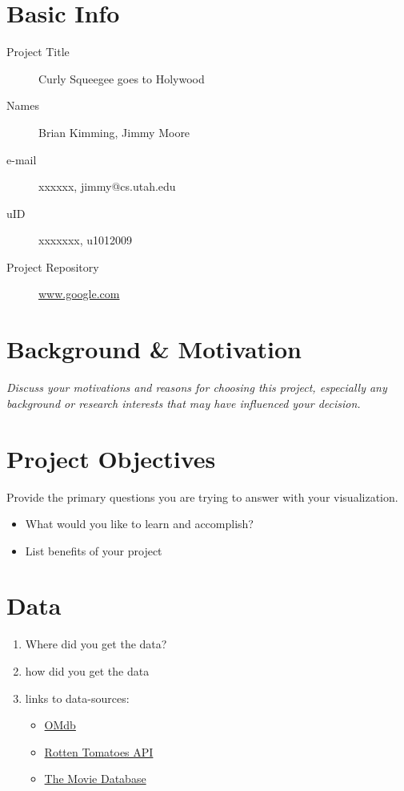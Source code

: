 \documentclass[12pt]{article}
\begin{document}
\section{Basic Info}
\begin{description}
 \item [Project Title]  Curly Squeegee goes to Holywood 
 \item [Names]  Brian Kimming, Jimmy Moore
 \item[e-mail] xxxxxx, jimmy@cs.utah.edu
 \item [uID] xxxxxxx, u1012009
 \item [Project Repository] \url{www.google.com}
\end{description}


\section{Background \& Motivation}
\textit{Discuss your motivations and reasons for choosing this project, especially any background or research interests that may have influenced your decision.}

\section{Project Objectives}
Provide the primary questions you are trying to answer with your visualization. 
\begin{itemize}
\item  What would you like to learn and accomplish?
\item  List benefits of your project

\end{itemize}

\section{Data}
\begin{enumerate}
\item Where did you get the data?
\item how did you get the data
\item links to data-sources:
\begin{itemize}
\item \href{www.omdbapi.com}{OMdb}
\item \href{http://developer.rottentomatoes.com/}{Rotten Tomatoes API}
\item \href{https://www.themoviedb.org/documentation/api}{The Movie Database}
\end{itemize}
\end{enumerate}
\end{document}

